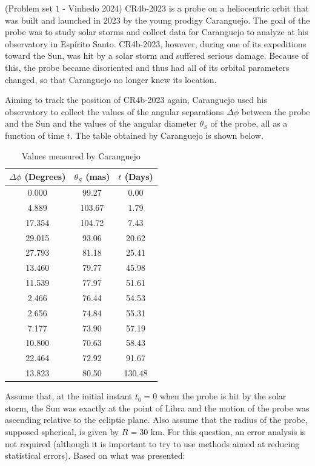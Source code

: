 \documentclass[11pt]{article}
\begin{document}
\begin{pproblem}(Problem set \(1\) - Vinhedo 2024) 
    CR4b-2023 is a probe on a heliocentric orbit that was built and launched in 2023 by the young prodigy Caranguejo. The goal of the probe was to study solar storms and collect data for Caranguejo to analyze at his observatory in Espírito Santo. CR4b-2023, however, during one of its expeditions toward the Sun, was hit by a solar storm and suffered serious damage. Because of this, the probe became disoriented and thus had all of its orbital parameters changed, so that Caranguejo no longer knew its location.

    Aiming to track the position of CR4b-2023 again, Caranguejo used his observatory to collect the values of the angular separations \(\Delta\phi\) between the probe and the Sun and the values of the angular diameter \(\theta_S\) of the probe, all as a function of time \(t\). The table obtained by Caranguejo is shown below.

    \begin{table}[H]
        \centering
        \begin{tabular}{|c|c|c|}
            \hline
            \(\Delta\phi\) (Degrees) & \(\theta_S\) (mas) & \(t\) (Days) \\
            \hline
            0.000 & 99.27 & 0.00 \\
            4.889 & 103.67 & 1.79 \\
            17.354 & 104.72 & 7.43 \\
            29.015 & 93.06 & 20.62 \\
            27.793 & 81.18 & 25.41 \\
            13.460 & 79.77 & 45.98 \\
            11.539 & 77.97 & 51.61 \\
            2.466 & 76.44 & 54.53 \\
            2.656 & 74.84 & 55.31 \\
            7.177 & 73.90 & 57.19 \\
            10.800 & 70.63 & 58.43 \\
            22.464 & 72.92 & 91.67 \\
            13.823 & 80.50 & 130.48 \\
            \hline
        \end{tabular}
        \caption{Values measured by Caranguejo}
    \end{table}

    Assume that, at the initial instant \(t_0 = 0\) when the probe is hit by the solar storm, the Sun was exactly at the point of Libra and the motion of the probe was ascending relative to the ecliptic plane. Also assume that the radius of the probe, supposed spherical, is given by \(R = 30\) km. For this question, an error analysis is not required (although it is important to try to use methods aimed at reducing statistical errors). Based on what was presented:


\end{pproblem}
\end{document}
